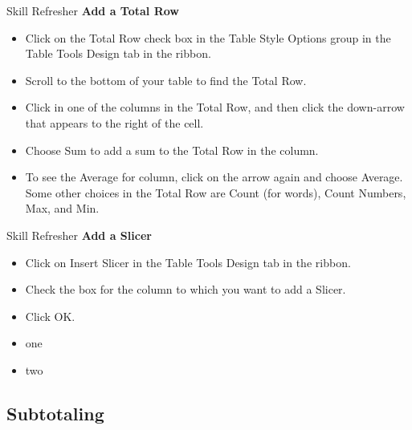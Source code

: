\begin{center}
	\begin{sklbox}{Skill Refresher}
		\textbf{Add a Total Row}
		\\
		\begin{itemize}
			\setlength{\itemsep}{0pt}
			\setlength{\parskip}{0pt}
			\setlength{\parsep}{0pt}

			\item Click on the Total Row check box in the Table Style Options group in the Table Tools Design tab in the ribbon.
			\item Scroll to the bottom of your table to find the Total Row.
			\item Click in one of the columns in the Total Row, and then click the down-arrow that appears to the right of the cell.
			\item Choose Sum to add a sum to the Total Row in the column.
			\item To see the Average for column, click on the arrow again and choose Average. Some other choices in the Total Row are Count (for words), Count Numbers, Max, and Min.
			
		\end{itemize}
	\end{sklbox}
\end{center}

\begin{center}
	\begin{sklbox}{Skill Refresher}
		\textbf{Add a Slicer}
		\\
		\begin{itemize}
			\setlength{\itemsep}{0pt}
			\setlength{\parskip}{0pt}
			\setlength{\parsep}{0pt}

			\item Click on Insert Slicer in the Table Tools Design tab in the ribbon.
			\item Check the box for the column to which you want to add a Slicer.
			\item Click OK.
			
			\item one
			\item two
			
		\end{itemize}
	\end{sklbox}
\end{center}




\subsection{Subtotaling}

